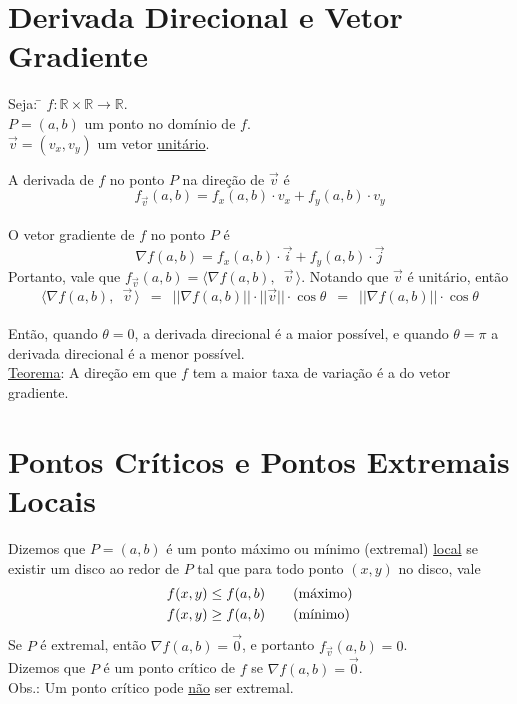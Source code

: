 \documentclass{article}
\begin{document}
\section{Derivada Direcional e Vetor Gradiente}
\begin{tabbing}
Seja: \= $f : \mathbb{R} \times \mathbb{R} \rightarrow \mathbb{R}$. \\[5pt]
  \> $P = (a, b)$ um ponto no domínio de $f$. \\[5pt]
  \> $\vec{v} = (v_x, v_y)$ um vetor \uline{unitário}.
\end{tabbing}
\vspace{10pt}
A derivada de $f$ no ponto $P$ na direção de $\vec{v}$ é
\[ f_{\vec{v}}(a,b) = f_x(a,b) \cdot v_x + f_y(a,b) \cdot v_y \] \\
O vetor gradiente de $f$ no ponto $P$ é
\[ \nabla f(a,b) = f_x(a,b) \cdot \vec{i} + f_y(a,b) \cdot \vec{j} \]
Portanto, vale que $f_{\vec{v}}(a,b) = \langle \nabla f(a,b), \enspace \vec{v} \, \rangle$. Notando que $\vec{v}$ é unitário, então
\[ \langle \nabla f(a,b), \enspace \vec{v} \, \rangle \enspace = \enspace  ||\nabla f(a,b)|| \cdot  ||\vec{v}|| \cdot \cos \theta \enspace = \enspace  ||\nabla f(a,b)|| \cdot \cos \theta \] \\
Então, quando $\theta = 0$, a derivada direcional é a maior possível, e quando $\theta = \pi$ a derivada direcional é a menor possível. \\[20pt]
\uline{Teorema}: A direção em que $f$ tem a maior taxa de variação é a do vetor gradiente.



\section{Pontos Críticos e Pontos Extremais Locais}
Dizemos que $P = (a,b)$ é um ponto máximo ou mínimo (extremal) \uline{local} se existir um disco ao redor de $P$ tal que para todo ponto $(x,y)$ no disco, vale
\begin{align*}
  f(x,y) \leq f(a,b) & \text{\qquad(máximo)} \\
  f(x,y) \geq f(a,b) & \text{\qquad(mínimo)}
\end{align*}
Se $P$ é extremal, então $\nabla f(a,b) = \vec{0}$, e portanto $f_{\vec{v}}(a,b) = 0$. \\[10pt]
Dizemos que $P$ é um ponto crítico de $f$ se $\nabla f(a,b) = \vec{0}$. \\[10pt]
Obs.: Um ponto crítico pode \uline{não} ser extremal.
\end{document}
